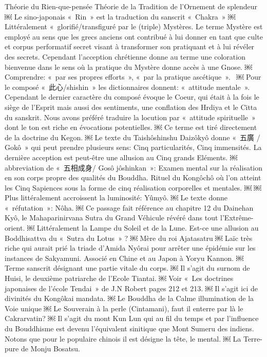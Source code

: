 Théorie du Rien-que-pensée
Théorie de la Tradition de l’Ornement de splendeur￼ Le sino-japonais « Rin » est la traduction du sanscrit « Chakra »
￼ Littéralement « glorifié/transfiguré par le (triple) Mystères. Le terme Mystère est employé au sens que les grecs anciens ont contribué à lui donner en tant que culte et corpus performatif secret visant à transformer son pratiquant et à lui révéler des secrets. Cependant l’acception chrétienne donne au terme une coloration bienvenue dans le sens où la pratique du Mystère donne accès à une Gnose.
￼ Comprendre: « par ses propres efforts », « par la pratique ascétique ». 
￼ Pour le composé « 此心/shishin » les dictionnaires donnent: « attitude mentale ». Cependant le dernier caractère du composé évoque le Coeur, qui était à la fois le siège de l’Esprit mais aussi des sentiments, une conflation des Hrdiya et le Citta du sanskrit. Nous avons préféré traduire la locution par « attitude spirituelle » dont le ton est riche en évocations potentielles.
￼ Ce terme est tiré directement de la doctrine du Kegon.
￼ Le texte du Taishôshinshu Daizôkyô donne « 五廣 / Gokô » qui peut prendre plusieurs sens: Cinq particularités, Cinq immensités. La dernière acception est peut-être une allusion au Cinq grands Eléments.
￼abbreviation de « 五相成身/ Gosô jôshinkan »: Examen mental sur la réalisation en son corps propre des qualités du Bouddha. Rituel du Kongôchô où l’on atteint les Cinq Sapiences sous la forme de cinq réalisation corporelles et mentales. 
￼ 
￼ Plus littéralement accroissent la luminosité: Yûmyô.
￼ Le texte donne « réfutation »: Nôha.
￼ Ce passage fait référence au chapitre 12 du Dainehan Kyô, le Mahaparinirvana Sutra du Grand Véhicule révéré dans tout l’Extrême-orient.
￼ Littéralement la Lampe du Soleil et de la Lune. Est-ce une allusion au Boddhisattva du « Sutra du Lotus » ? 	
￼ Mère du roi Ajatasatru
￼ Laïc très riche qui aurait prié la triade d’Amida Nyôrai pour arrêter une épidémie sur les instances de Sakyamuni. Associé en Chine et au Japon à Yoryu Kannon. 
￼ Terme sanscrit désignant une partie vitale du corps.
￼ Il s’agit du surnom de Huisi, le deuxième patriarche de l’Ecole Tiantai. 
￼ Voir « Les doctrines japonaises de l’école Tendai » de J.N Robert pages 212 et 213.
￼ Il s’agit ici de divinités du Kongôkai mandata.
￼ Le Bouddha de la Calme illumination de la Voie unique
￼ Le Souverain à la perle (Cintamani), faut il enterre par là le Cakrarvatin?
￼ Il s’agit du mont Kun Lun qui au fil du temps et par l’influence du Bouddhisme est devenu l’équivalent sinitique que Mont Sumeru des indiens. Notons que pour le populaire chinois il est désigne la tête, le mental.
￼ La Terre-pure de Monju Bosatsu.
